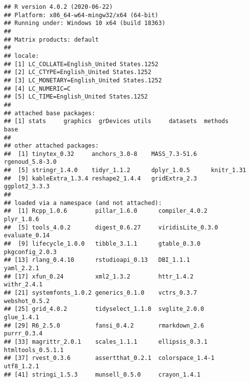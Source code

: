 \documentclass[
]{article}
\begin{document}
\begin{verbatim}
## R version 4.0.2 (2020-06-22)
## Platform: x86_64-w64-mingw32/x64 (64-bit)
## Running under: Windows 10 x64 (build 18363)
## 
## Matrix products: default
## 
## locale:
## [1] LC_COLLATE=English_United States.1252 
## [2] LC_CTYPE=English_United States.1252   
## [3] LC_MONETARY=English_United States.1252
## [4] LC_NUMERIC=C                          
## [5] LC_TIME=English_United States.1252    
## 
## attached base packages:
## [1] stats     graphics  grDevices utils     datasets  methods   base     
## 
## other attached packages:
##  [1] tinytex_0.32     anchors_3.0-8    MASS_7.3-51.6    rgenoud_5.8-3.0 
##  [5] stringr_1.4.0    tidyr_1.1.2      dplyr_1.0.5      knitr_1.31      
##  [9] kableExtra_1.3.4 reshape2_1.4.4   gridExtra_2.3    ggplot2_3.3.3   
## 
## loaded via a namespace (and not attached):
##  [1] Rcpp_1.0.6        pillar_1.6.0      compiler_4.0.2    plyr_1.8.6       
##  [5] tools_4.0.2       digest_0.6.27     viridisLite_0.3.0 evaluate_0.14    
##  [9] lifecycle_1.0.0   tibble_3.1.1      gtable_0.3.0      pkgconfig_2.0.3  
## [13] rlang_0.4.10      rstudioapi_0.13   DBI_1.1.1         yaml_2.2.1       
## [17] xfun_0.24         xml2_1.3.2        httr_1.4.2        withr_2.4.1      
## [21] systemfonts_1.0.2 generics_0.1.0    vctrs_0.3.7       webshot_0.5.2    
## [25] grid_4.0.2        tidyselect_1.1.0  svglite_2.0.0     glue_1.4.1       
## [29] R6_2.5.0          fansi_0.4.2       rmarkdown_2.6     purrr_0.3.4      
## [33] magrittr_2.0.1    scales_1.1.1      ellipsis_0.3.1    htmltools_0.5.1.1
## [37] rvest_0.3.6       assertthat_0.2.1  colorspace_1.4-1  utf8_1.2.1       
## [41] stringi_1.5.3     munsell_0.5.0     crayon_1.4.1
\end{verbatim}
\end{document}
